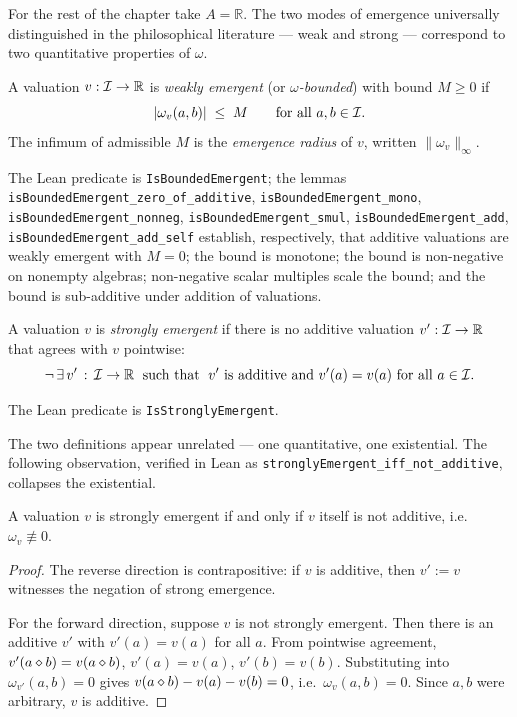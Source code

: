 For the rest of the chapter take $A = \mathbb{R}$. The two modes of
emergence universally distinguished in the philosophical literature ---
weak and strong --- correspond to two quantitative properties of $\omega$.

\begin{definition}\label{def:weak}
A valuation $v : \mathcal{I} \to \mathbb{R}$ is \emph{weakly emergent} (or
\emph{$\omega$-bounded}) with bound $M \ge 0$ if
\[
  |\omega_v(a,b)| \;\le\; M \qquad\text{for all } a, b \in \mathcal{I}.
\]
The infimum of admissible $M$ is the \emph{emergence radius} of $v$, written
$\|\omega_v\|_\infty$.
\end{definition}

The Lean predicate is \texttt{IsBoundedEmergent}; the lemmas
\texttt{isBoundedEmergent\_zero\_of\_additive},
\texttt{isBoundedEmergent\_mono}, \texttt{isBoundedEmergent\_nonneg},
\texttt{isBoundedEmergent\_smul}, \texttt{isBoundedEmergent\_add},
\texttt{isBoundedEmergent\_add\_self} establish, respectively, that
additive valuations are weakly emergent with $M=0$; the bound is monotone;
the bound is non-negative on nonempty algebras; non-negative scalar
multiples scale the bound; and the bound is sub-additive under addition of
valuations.

\begin{definition}\label{def:strong}
A valuation $v$ is \emph{strongly emergent} if there is no additive
valuation $v' : \mathcal{I} \to \mathbb{R}$ that agrees with $v$ pointwise:
\[
  \neg\,\exists\,v'\,:\,\mathcal{I}\to\mathbb{R} \;\text{ such that }\;
  v'\text{ is additive and } v'(a) = v(a) \text{ for all } a\in\mathcal{I}.
\]
\end{definition}

The Lean predicate is \texttt{IsStronglyEmergent}.

The two definitions appear unrelated --- one quantitative, one
existential. The following observation, verified in Lean as
\texttt{stronglyEmergent\_iff\_not\_additive}, collapses the existential.

\begin{proposition}\label{prop:strong-iff}
A valuation $v$ is strongly emergent if and only if $v$ itself is not
additive, i.e.\ $\omega_v \not\equiv 0$.
\end{proposition}

\begin{proof}
The reverse direction is contrapositive: if $v$ is additive, then $v' := v$
witnesses the negation of strong emergence.

For the forward direction, suppose $v$ is not strongly emergent. Then there
is an additive $v'$ with $v'(a) = v(a)$ for all $a$. From pointwise
agreement, $v'(a\mathbin{\diamond} b) = v(a\mathbin{\diamond} b)$, $v'(a) = v(a)$, $v'(b) =
v(b)$. Substituting into $\omega_{v'}(a,b) = 0$ gives $v(a\mathbin{\diamond} b) -
v(a) - v(b) = 0$, i.e.\ $\omega_v(a,b) = 0$. Since $a,b$ were arbitrary,
$v$ is additive.
\end{proof}

